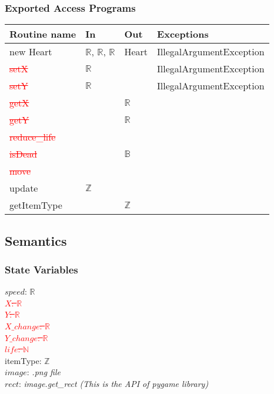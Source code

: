 \documentclass[12pt]{article}
\begin{document}
\subsubsection*{Exported Access Programs}
\begin{tabular}{| l | l | l | p{5cm} |}
\hline
\textbf{Routine name} & \textbf{In} & \textbf{Out} & \textbf{Exceptions}\\
\hline
new Heart & $\mathbb{R}$, $\mathbb{R}$, $\mathbb{R}$ & Heart & IllegalArgumentException\\
\hline
\textcolor{red}{\st{setX}} & $\mathbb{R}$ &  & IllegalArgumentException\\
\hline
\textcolor{red}{\st{setY}} & $\mathbb{R}$ &  & IllegalArgumentException\\
\hline
\textcolor{red}{\st{getX }}&    & $\mathbb{R}$ & \\
\hline
\textcolor{red}{\st{getY}} &    & $\mathbb{R}$ & \\
\hline
\textcolor{red}{\st{reduce\_life}} & & & \\
\hline
\textcolor{red}{\st{isDead}} & & $\mathbb{B}$ & \\
\hline
\textcolor{red}{\st{move}} & & &\\
\hline
update & $\mathbb{Z}$ &&\\
\hline
getItemType &&$\mathbb{Z}$&\\
\hline
\end{tabular}

\subsection*{Semantics}
\subsubsection*{State Variables}
$\mathit{speed}$: $\mathbb{R}$\\
\textcolor{red}{\st{$\mathit{X}$: $\mathbb{R}$}}\\
\textcolor{red}{\st{$\mathit{Y}$: $\mathbb{R}$}}\\
\textcolor{red}{\st{$\mathit{X\_change}$: $\mathbb{R}$}}\\
\textcolor{red}{\st{$\mathit{Y\_change}$: $\mathbb{R}$}}\\
\textcolor{red}{\st{$\mathit{life}$: $\mathbb{N}$}}\\
itemType: $\mathbb{Z}$\\
$\mathit{image}$: \textit{.png file}\\
$\mathit{rect}$: \textit{image.get\_rect (This is the API of pygame library)}
\end{document}
